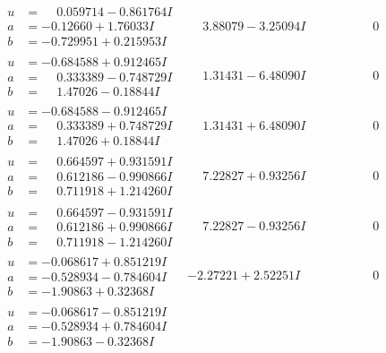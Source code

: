 \documentclass[1p]{elsarticle_modified}
\theoremstyle{definition}
\begin{document}
$$\begin{array}{c|c|c}
\begin{aligned}
u &= \phantom{-}0.059714 - 0.861764 I \\
a &= -0.12660 + 1.76033 I \\
b &= -0.729951 + 0.215953 I\end{aligned}
 & \phantom{-}3.88079 - 3.25094 I & \phantom{-0.000000 } 0 \\ \hline\begin{aligned}
u &= -0.684588 + 0.912465 I \\
a &= \phantom{-}0.333389 - 0.748729 I \\
b &= \phantom{-}1.47026 - 0.18844 I\end{aligned}
 & \phantom{-}1.31431 - 6.48090 I & \phantom{-0.000000 } 0 \\ \hline\begin{aligned}
u &= -0.684588 - 0.912465 I \\
a &= \phantom{-}0.333389 + 0.748729 I \\
b &= \phantom{-}1.47026 + 0.18844 I\end{aligned}
 & \phantom{-}1.31431 + 6.48090 I & \phantom{-0.000000 } 0 \\ \hline\begin{aligned}
u &= \phantom{-}0.664597 + 0.931591 I \\
a &= \phantom{-}0.612186 - 0.990866 I \\
b &= \phantom{-}0.711918 + 1.214260 I\end{aligned}
 & \phantom{-}7.22827 + 0.93256 I & \phantom{-0.000000 } 0 \\ \hline\begin{aligned}
u &= \phantom{-}0.664597 - 0.931591 I \\
a &= \phantom{-}0.612186 + 0.990866 I \\
b &= \phantom{-}0.711918 - 1.214260 I\end{aligned}
 & \phantom{-}7.22827 - 0.93256 I & \phantom{-0.000000 } 0 \\ \hline\begin{aligned}
u &= -0.068617 + 0.851219 I \\
a &= -0.528934 - 0.784604 I \\
b &= -1.90863 + 0.32368 I\end{aligned}
 & -2.27221 + 2.52251 I & \phantom{-0.000000 } 0 \\ \hline\begin{aligned}
u &= -0.068617 - 0.851219 I \\
a &= -0.528934 + 0.784604 I \\
b &= -1.90863 - 0.32368 I\end{aligned}

\end{array}$$
\end{document}
